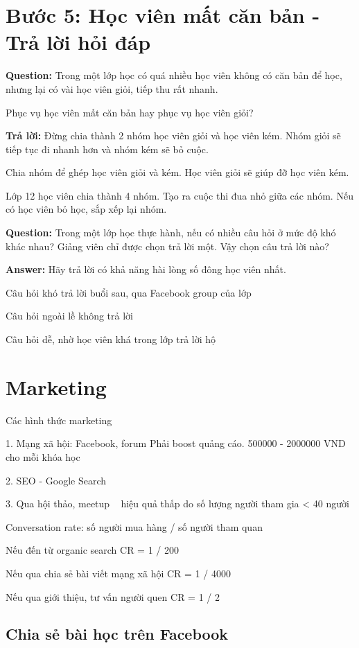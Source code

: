 \section{Bước 5: Học viên mất căn bản - Trả lời hỏi đáp}

\textbf{Question:} Trong một lớp học có quá nhiều học viên không có căn bản để học, nhưng lại có vài học viên giỏi, tiếp thu rất nhanh.

Phục vụ học viên mất căn bản hay phục vụ học viên giỏi?

\textbf{Trả lời:} Đừng chia thành 2 nhóm học viên giỏi và học viên kém. Nhóm giỏi sẽ tiếp tục đi nhanh hơn và nhóm kém sẽ bỏ cuộc.

Chia nhóm để ghép học viên giỏi và kém. Học viên giỏi sẽ giúp đỡ học viên kém.

Lớp 12 học viên chia thành 4 nhóm. Tạo ra cuộc thi đua nhỏ giữa các nhóm. Nếu có học viên bỏ học, sắp xếp lại nhóm.

\textbf{Question:} Trong một lớp học thực hành, nếu có nhiều câu hỏi ở mức độ khó khác nhau? Giảng viên chỉ được chọn trả lời một. Vậy chọn câu trả lời nào?

\textbf{Answer:} Hãy trả lời có khả năng hài lòng số đông học viên nhất.

Câu hỏi khó trả lời buổi sau, qua Facebook group của lớp

Câu hỏi ngoài lề không trả lời

Câu hỏi dễ, nhờ học viên khá trong lớp trả lời hộ

\section{Marketing}

Các hình thức marketing

1. Mạng xã hội: Facebook, forum
Phải boost quảng cáo. 500000 - 2000000 VND cho mỗi khóa học

2. SEO - Google Search

3. Qua hội thảo, meetup ~ hiệu quả thấp do số lượng người tham gia < 40 người

Conversation rate: số người mua hàng / số người tham quan

Nếu đến từ organic search CR = 1 / 200

Nếu qua chia sẻ bài viết mạng xã hội CR = 1 / 4000

Nếu qua giới thiệu, tư vấn người quen CR = 1 / 2

\subsection{Chia sẻ bài học trên Facebook}

